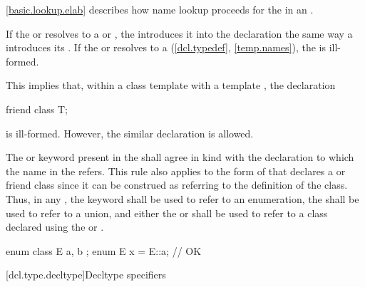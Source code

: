 \pnum
\begin{note}
\ref{basic.lookup.elab} describes how name lookup proceeds for the
 in an .
\end{note}
If the  or 
resolves to a  or
, the 
introduces it into the declaration the same way a
 introduces
its .
If the  or  resolves to a
 (\ref{dcl.typedef}, \ref{temp.names}),
the  is ill-formed.
\begin{note}
This implies that, within a class template with a template
 , the declaration

\begin{codeblock}
friend class T;
\end{codeblock}

is ill-formed. However, the similar declaration  is allowed.
\end{note}

\pnum
The  or  keyword
present in the
 shall agree in kind with the
declaration to which the name in the
 refers. This rule also applies to
the form of  that declares a
 or friend class since it can be construed
as referring to the definition of the class. Thus, in any
, the  keyword
shall be
used to refer to an enumeration, the 
 shall be used to refer to a union,
and either the  or 
 shall be used to refer to a class
declared using the  or 
. \begin{example}

\begin{codeblock}
enum class E { a, b };
enum E x = E::a;                // OK
\end{codeblock}
\end{example}

[dcl.type.decltype]{Decltype specifiers}%
%

